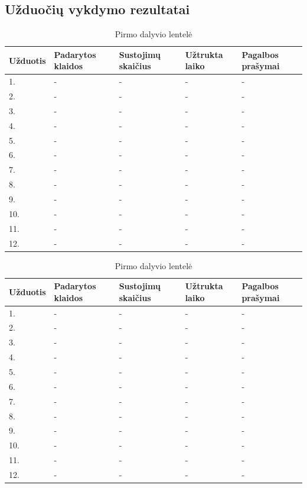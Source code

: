 \documentclass[oneside]{VUMIFPSkursinis}
\begin{document}
\subsection{Užduočių vykdymo rezultatai}
\begin{center}
	\begin{table}[!pht]
	\caption{Pirmo dalyvio lentelė}
	\begin{tabular}{ |p{1.8cm} | p{3.4cm} | p{3.4cm} | p{2.5cm} | p{3.5cm}|}
	\hline
	Užduotis&Padarytos klaidos&Sustojimų skaičius&Užtrukta laiko&Pagalbos prašymai\\ \hline
1.&-&-&-&- \\ \hline
2.&-&-&-&- \\ \hline
3.&-&-&-&- \\ \hline
4.&-&-&-&- \\ \hline
5.&-&-&-&- \\ \hline
6.&-&-&-&- \\ \hline
7.&-&-&-&- \\ \hline
8.&-&-&-&- \\ \hline
9.&-&-&-&- \\ \hline
10.&-&-&-&- \\ \hline
11.&-&-&-&- \\ \hline
12.&-&-&-&- \\ \hline
\end{tabular}
\end{table}
\vspace{0.7cm}
	\begin{table}[!pht]
	\caption{Pirmo dalyvio lentelė}
	\begin{tabular}{ |p{1.8cm} | p{3.4cm} | p{3.4cm} | p{2.5cm} | p{3.5cm}|}
	\hline
	Užduotis&Padarytos klaidos&Sustojimų skaičius&Užtrukta laiko&Pagalbos prašymai\\ \hline
1.&-&-&-&- \\ \hline
2.&-&-&-&- \\ \hline
3.&-&-&-&- \\ \hline
4.&-&-&-&- \\ \hline
5.&-&-&-&- \\ \hline
6.&-&-&-&- \\ \hline
7.&-&-&-&- \\ \hline
8.&-&-&-&- \\ \hline
9.&-&-&-&- \\ \hline
10.&-&-&-&- \\ \hline
11.&-&-&-&- \\ \hline
12.&-&-&-&- \\ \hline
\end{tabular}

\end{table}
\end{center}
\end{document}
